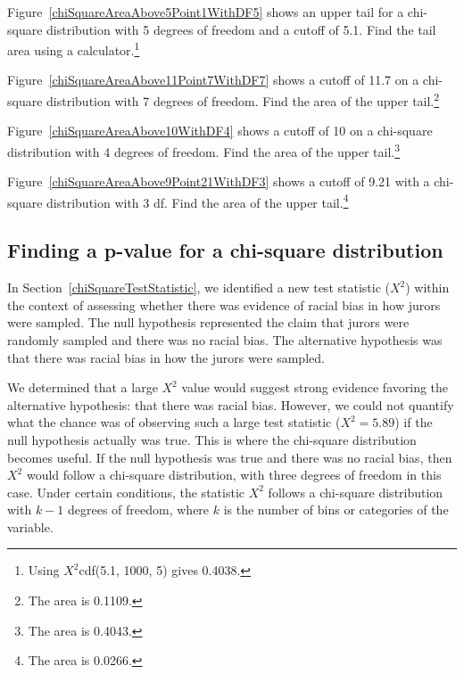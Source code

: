 \begin{exercise}
Figure~\ref{chiSquareAreaAbove5Point1WithDF5} shows an upper tail for a chi-square distribution with 5 degrees of freedom and a cutoff of 5.1. Find the tail area using a calculator.\footnote{Using $X^2$cdf(5.1, 1000, 5) gives 0.4038.}
\end{exercise}

\begin{exercise}
Figure~\ref{chiSquareAreaAbove11Point7WithDF7} shows a cutoff of 11.7 on a chi-square distribution with 7 degrees of freedom. Find the area of the upper tail.\footnote{The area is 0.1109.}
\end{exercise}

\begin{exercise}
Figure~\ref{chiSquareAreaAbove10WithDF4} shows a cutoff of 10 on a chi-square distribution with 4 degrees of freedom. Find the area of the upper tail.\footnote{The area is 0.4043.}
\end{exercise}

\begin{exercise}
Figure~\ref{chiSquareAreaAbove9Point21WithDF3} shows a cutoff of 9.21 with a chi-square distribution with 3 df. Find the area of the upper tail.\footnote{The area is 0.0266.}
\end{exercise}


\subsection{Finding a p-value for a chi-square distribution}
\label{pValueForAChiSquareTest}

In Section~\ref{chiSquareTestStatistic}, we identified a new test statistic ($X^2$) within the context of assessing whether there was evidence of racial bias in how jurors were sampled. The null hypothesis represented the claim that jurors were randomly sampled and there was no racial bias. The alternative hypothesis was that there was racial bias in how the jurors were sampled.

We determined that a large $X^2$ value would suggest strong evidence favoring the alternative hypothesis: that there was racial bias. However, we could not quantify what the chance was of observing such a large test statistic ($X^2=5.89$) if the null hypothesis actually was true. This is where the chi-square distribution becomes useful. If the null hypothesis was true and there was no racial bias, then $X^2$ would follow a chi-square distribution, with three degrees of freedom in this case. Under certain conditions, the statistic $X^2$ follows a chi-square distribution with $k-1$ degrees of freedom, where $k$ is the number of bins or categories of the variable.

